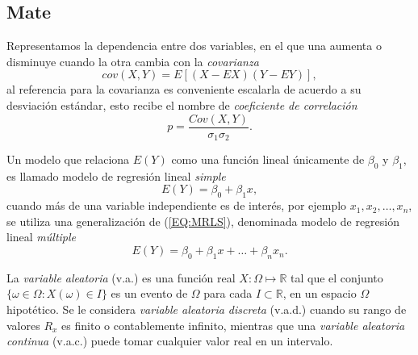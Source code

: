 \subsection {Mate}
Representamos la dependencia entre dos variables, en el que una aumenta o disminuye cuando la otra cambia con la \emph{covarianza}
\begin{equation}
cov(X,Y)=E[(X-EX)(Y-EY)],
\end{equation}
al referencia para la covarianza es conveniente escalarla de acuerdo a su desviación estándar, esto recibe el nombre de  \emph{coeficiente de correlación}
\begin{equation}
p=\frac{Cov(X,Y)}{\sigma_1\sigma_2}.
\end{equation}

Un modelo que relaciona $E(Y)$ como una función lineal únicamente de $\beta_0$ y $\beta_1$, es llamado modelo de regresión lineal \emph{simple}
\begin{equation}
E(Y)=\beta_0+\beta_1x\label{EQ:MRLS},
\end{equation}
cuando más de una variable independiente es de interés, por ejemplo $x_1,x_2,\ldots,x_n$, se utiliza una generalización de (\ref{EQ:MRLS}), denominada modelo de regresión lineal \emph{múltiple}
\begin{equation}
E(Y)=\beta_0+\beta_1x+\ldots+\beta_nx_n.
\end{equation}

La \emph{variable aleatoria} (v.a.) es una función real $X: \Omega\mapsto\mathbb{R}$ tal que el conjunto $\{\omega\in\Omega:X(\omega)\in I\}$ es un evento de $\Omega$ para cada $I\subset\mathbb{R}$, en un espacio $\Omega$ hipotético. Se le considera \emph{variable aleatoria discreta} (v.a.d.) cuando su rango de valores $R_x$ es finito o contablemente infinito, mientras que una \emph{variable aleatoria continua} (v.a.c.) puede tomar cualquier valor real en un intervalo.



